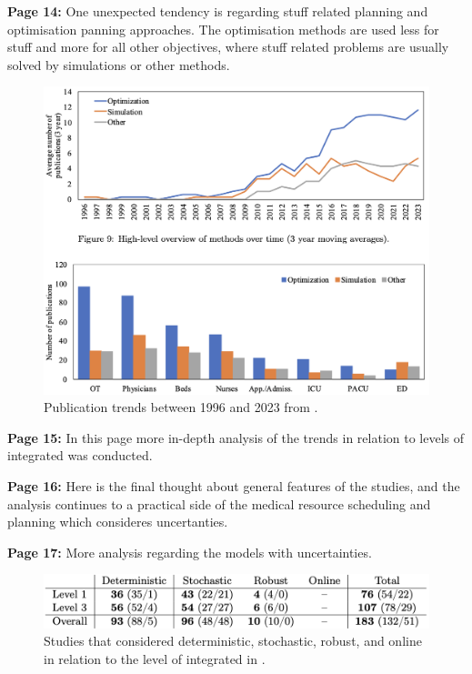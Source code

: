     \textbf{Page 14:}
    One unexpected tendency is regarding stuff related planning and optimisation panning approaches. The optimisation methods are used less for stuff and more for all other objectives, where stuff related problems are usually solved by simulations or other methods.
    \begin{figure}[H]
        \centering
        \includegraphics[width=1\textwidth]{figures/0010_SR02NL23/fig6.png}
        \caption{Publication trends between 1996 and 2023 from \cite{x338}.}
        \label{fig6:0010_SR02NL23}
    \end{figure}

    \textbf{Page 15:}
    In this page more in-depth analysis of the trends in relation to levels of integrated was conducted.
    
    \textbf{Page 16:}
    Here is the final thought about general features of the studies, and the analysis continues to a practical side of the medical resource scheduling and planning which consideres uncertanties.
    
    \textbf{Page 17:}
    More analysis regarding the models with uncertainties.
    \begin{figure}[H]
        \centering
        \includegraphics[width=1\textwidth]{figures/0010_SR02NL23/fig7.png}
        \caption{Studies that considered deterministic, stochastic, robust, and online in relation to the level of integrated in \cite{x338}.}
        \label{fig7:0010_SR02NL23}
    \end{figure}

